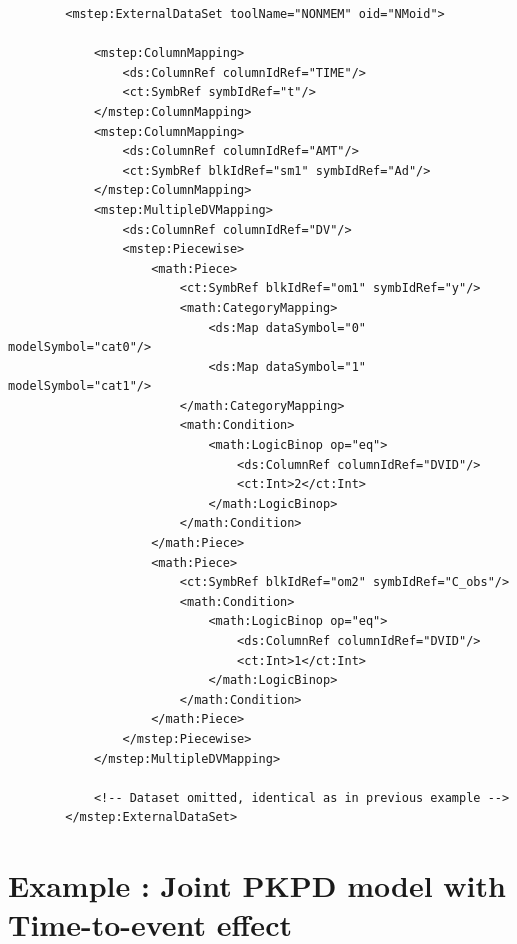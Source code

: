 \lstset{language=XML}
\begin{lstlisting}
        <mstep:ExternalDataSet toolName="NONMEM" oid="NMoid">
            
            <mstep:ColumnMapping>
                <ds:ColumnRef columnIdRef="TIME"/>
                <ct:SymbRef symbIdRef="t"/>
            </mstep:ColumnMapping>
            <mstep:ColumnMapping>
                <ds:ColumnRef columnIdRef="AMT"/>
                <ct:SymbRef blkIdRef="sm1" symbIdRef="Ad"/>
            </mstep:ColumnMapping>
            <mstep:MultipleDVMapping>
                <ds:ColumnRef columnIdRef="DV"/>
                <mstep:Piecewise>
                    <math:Piece>
                        <ct:SymbRef blkIdRef="om1" symbIdRef="y"/>
                        <math:CategoryMapping>
                            <ds:Map dataSymbol="0" modelSymbol="cat0"/>
                            <ds:Map dataSymbol="1" modelSymbol="cat1"/>
                        </math:CategoryMapping>
                        <math:Condition>
                            <math:LogicBinop op="eq">
                                <ds:ColumnRef columnIdRef="DVID"/>
                                <ct:Int>2</ct:Int>
                            </math:LogicBinop>
                        </math:Condition>
                    </math:Piece>
                    <math:Piece>
                        <ct:SymbRef blkIdRef="om2" symbIdRef="C_obs"/>
                        <math:Condition>
                            <math:LogicBinop op="eq">
                                <ds:ColumnRef columnIdRef="DVID"/>
                                <ct:Int>1</ct:Int>
                            </math:LogicBinop>
                        </math:Condition>
                    </math:Piece>
                </mstep:Piecewise>
            </mstep:MultipleDVMapping>
            
            <!-- Dataset omitted, identical as in previous example -->
        </mstep:ExternalDataSet>
\end{lstlisting}




\newpage

\section{Example \theexamples: Joint PKPD model with Time-to-event effect}
\label{sec:eg8}

